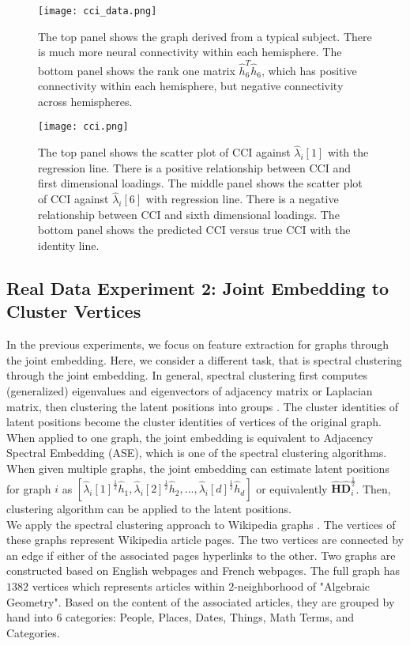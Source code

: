 \documentclass[10pt,journal,compsoc]{IEEEtran}
\newcommand{\bH}{\mathbf{H}}
\newcommand{\bD}{\mathbf{D}}
\begin{document}
\begin{figure}[!htbp]
	\centering
	\texttt{[image: cci\_data.png]}
	\caption{The top panel shows the graph derived from a typical subject. There is much more neural connectivity within each hemisphere. The bottom panel shows the rank one matrix $\hat{h}_6^T\hat{h}_6$, which has positive  connectivity within each hemisphere, but negative  connectivity across hemispheres.  }
	\label{fig:cci1}
\end{figure} 

\begin{figure}[!htbp]
	\centering
	\texttt{[image: cci.png]}
	\caption{The top panel shows the scatter plot of CCI against $\hat{\lambda}_i[1]$ with the regression line. There is a positive relationship between CCI and first dimensional loadings. The middle panel shows the scatter plot of CCI against $\hat{\lambda}_i[6]$ with regression line. There is a negative relationship between CCI and sixth dimensional loadings. The bottom panel shows the predicted CCI versus true CCI with the identity line.}
	\label{fig:cci}
\end{figure}

\subsection{Real Data Experiment 2: Joint Embedding to Cluster Vertices}
In the previous experiments, we focus on feature extraction for graphs through the joint embedding. Here, we consider a different task, that is spectral clustering through the joint embedding. In general, spectral clustering first computes (generalized) eigenvalues and eigenvectors of adjacency matrix or Laplacian matrix, then clustering the latent positions into groups \cite{sussman2012consistent, belkin2003laplacian}. The cluster identities of latent positions become the cluster identities of vertices of the original graph. When applied to one graph, the joint embedding is equivalent to Adjacency Spectral Embedding (ASE), which is one of the spectral clustering algorithms. When given multiple graphs, the joint embedding can estimate latent positions for graph $i$ as $[\hat{\lambda}_i[1]^{\frac{1}{2}}\hat{h}_1,\hat{\lambda}_i[2]^{\frac{1}{2}}\hat{h}_2,...,\hat{\lambda}_i[d]^{\frac{1}{2}}\hat{h}_d]$ or equivalently $\hat{\bH} \hat{\bD}_i ^ {\frac{1}{2}}$. Then, clustering algorithm can be applied to the latent positions. \\

\noindent We apply the spectral clustering approach to Wikipedia graphs \cite{suwan2016empirical}. The vertices of these graphs represent Wikipedia article pages. The two vertices are connected by an edge if either of the associated pages hyperlinks to the other. Two graphs are constructed based on English webpages and French webpages. The full graph has $1382$ vertices which represents articles within $2$-neighborhood of "Algebraic Geometry".  Based on the content of the associated articles, they are grouped by hand into $6$ categories: People, Places, Dates, Things, Math Terms, and Categories.\\
\end{document}
